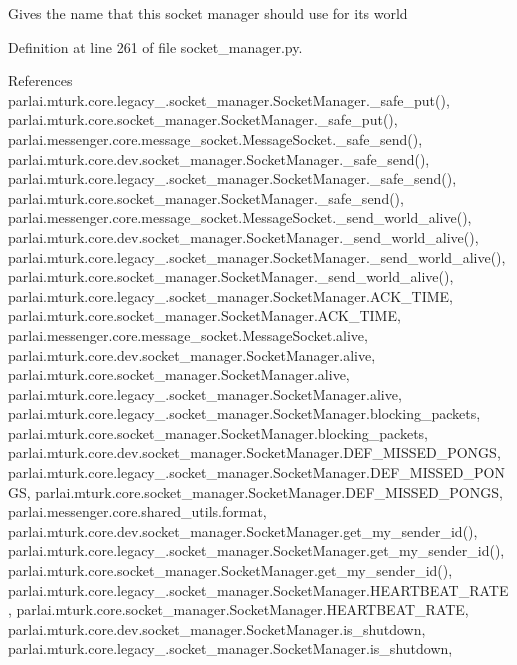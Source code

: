 \begin{DoxyVerb}Gives the name that this socket manager should use for its world\end{DoxyVerb}
 

Definition at line 261 of file socket\+\_\+manager.\+py.



References parlai.\+mturk.\+core.\+legacy\+\_.\+socket\+\_\+manager.\+Socket\+Manager.\+\_\+safe\+\_\+put(), parlai.\+mturk.\+core.\+socket\+\_\+manager.\+Socket\+Manager.\+\_\+safe\+\_\+put(), parlai.\+messenger.\+core.\+message\+\_\+socket.\+Message\+Socket.\+\_\+safe\+\_\+send(), parlai.\+mturk.\+core.\+dev.\+socket\+\_\+manager.\+Socket\+Manager.\+\_\+safe\+\_\+send(), parlai.\+mturk.\+core.\+legacy\+\_.\+socket\+\_\+manager.\+Socket\+Manager.\+\_\+safe\+\_\+send(), parlai.\+mturk.\+core.\+socket\+\_\+manager.\+Socket\+Manager.\+\_\+safe\+\_\+send(), parlai.\+messenger.\+core.\+message\+\_\+socket.\+Message\+Socket.\+\_\+send\+\_\+world\+\_\+alive(), parlai.\+mturk.\+core.\+dev.\+socket\+\_\+manager.\+Socket\+Manager.\+\_\+send\+\_\+world\+\_\+alive(), parlai.\+mturk.\+core.\+legacy\+\_.\+socket\+\_\+manager.\+Socket\+Manager.\+\_\+send\+\_\+world\+\_\+alive(), parlai.\+mturk.\+core.\+socket\+\_\+manager.\+Socket\+Manager.\+\_\+send\+\_\+world\+\_\+alive(), parlai.\+mturk.\+core.\+legacy\+\_.\+socket\+\_\+manager.\+Socket\+Manager.\+A\+C\+K\+\_\+\+T\+I\+ME, parlai.\+mturk.\+core.\+socket\+\_\+manager.\+Socket\+Manager.\+A\+C\+K\+\_\+\+T\+I\+ME, parlai.\+messenger.\+core.\+message\+\_\+socket.\+Message\+Socket.\+alive, parlai.\+mturk.\+core.\+dev.\+socket\+\_\+manager.\+Socket\+Manager.\+alive, parlai.\+mturk.\+core.\+socket\+\_\+manager.\+Socket\+Manager.\+alive, parlai.\+mturk.\+core.\+legacy\+\_.\+socket\+\_\+manager.\+Socket\+Manager.\+alive, parlai.\+mturk.\+core.\+legacy\+\_.\+socket\+\_\+manager.\+Socket\+Manager.\+blocking\+\_\+packets, parlai.\+mturk.\+core.\+socket\+\_\+manager.\+Socket\+Manager.\+blocking\+\_\+packets, parlai.\+mturk.\+core.\+dev.\+socket\+\_\+manager.\+Socket\+Manager.\+D\+E\+F\+\_\+\+M\+I\+S\+S\+E\+D\+\_\+\+P\+O\+N\+GS, parlai.\+mturk.\+core.\+legacy\+\_.\+socket\+\_\+manager.\+Socket\+Manager.\+D\+E\+F\+\_\+\+M\+I\+S\+S\+E\+D\+\_\+\+P\+O\+N\+GS, parlai.\+mturk.\+core.\+socket\+\_\+manager.\+Socket\+Manager.\+D\+E\+F\+\_\+\+M\+I\+S\+S\+E\+D\+\_\+\+P\+O\+N\+GS, parlai.\+messenger.\+core.\+shared\+\_\+utils.\+format, parlai.\+mturk.\+core.\+dev.\+socket\+\_\+manager.\+Socket\+Manager.\+get\+\_\+my\+\_\+sender\+\_\+id(), parlai.\+mturk.\+core.\+legacy\+\_.\+socket\+\_\+manager.\+Socket\+Manager.\+get\+\_\+my\+\_\+sender\+\_\+id(), parlai.\+mturk.\+core.\+socket\+\_\+manager.\+Socket\+Manager.\+get\+\_\+my\+\_\+sender\+\_\+id(), parlai.\+mturk.\+core.\+legacy\+\_.\+socket\+\_\+manager.\+Socket\+Manager.\+H\+E\+A\+R\+T\+B\+E\+A\+T\+\_\+\+R\+A\+TE, parlai.\+mturk.\+core.\+socket\+\_\+manager.\+Socket\+Manager.\+H\+E\+A\+R\+T\+B\+E\+A\+T\+\_\+\+R\+A\+TE, parlai.\+mturk.\+core.\+dev.\+socket\+\_\+manager.\+Socket\+Manager.\+is\+\_\+shutdown, parlai.\+mturk.\+core.\+legacy\+\_.\+socket\+\_\+manager.\+Socket\+Manager.\+is\+\_\+shutdown, 